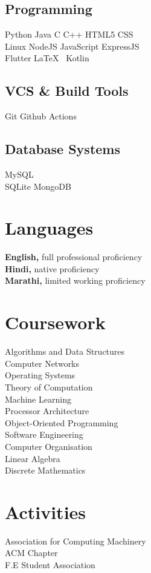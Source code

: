 \documentclass[]{deedy-resume-openfont}
\begin{document}
\begin{minipage}[t]{0.97\textwidth}
\subsection{Programming}
  Python   \textbullet{}  Java  \textbullet{}  C  \textbullet{}   C++   \textbullet{}   HTML5   \textbullet{}   CSS  \\
  Linux  \textbullet{}   NodeJS   \textbullet{}   JavaScript   \textbullet{} ExpressJS   \\
Flutter   \textbullet{}   \LaTeX\ \textbullet{ }   Kotlin \\
\subsection{VCS \& Build Tools}
Git \textbullet{} Github Actions
\subsection{Database Systems}
MySQL \\
SQLite  \textbullet{} MongoDB
\sectionsep

\section{Languages}
\textbullet{} \textbf{English,} full professional proficiency \\
\textbullet{} \textbf{Hindi,} native proficiency \\
\textbullet{} \textbf{Marathi,} limited working proficiency\\

\section{Coursework}
\textbullet{} Algorithms and Data Structures \\
\textbullet{} Computer Networks \\
\textbullet{} Operating Systems \\
\textbullet{} Theory of Computation \\
\textbullet{} Machine Learning \\
\textbullet{} Processor Architecture \\
\textbullet{} Object-Oriented Programming \\
\textbullet{} Software Engineering \\
\textbullet{} Computer Organisation \\
\textbullet{} Linear Algebra \\
\textbullet{} Discrete Mathematics 

\section{Activities}
\textbullet{} Association for Computing Machinery\\
\textbullet{} ACM Chapter\\
\textbullet{} F.E Student Association\\
\sectionsep

\end{minipage}%
\end{document}
